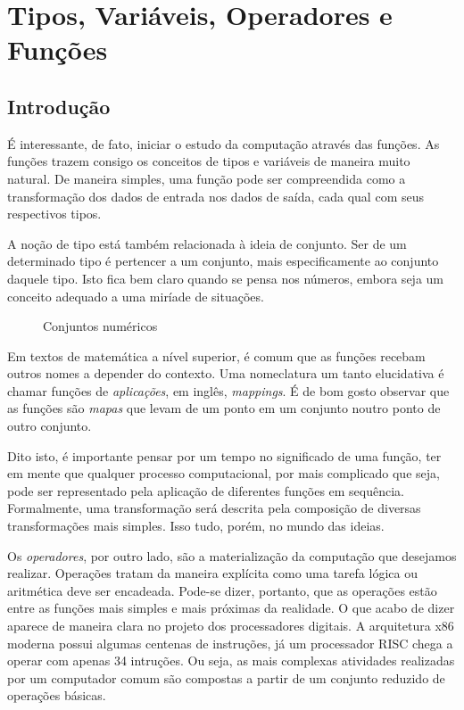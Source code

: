\chapter{Tipos, Variáveis, Operadores e Funções}%

	\section*{Introdução}%
	É interessante, de fato, iniciar o estudo da computação através das funções. As funções trazem consigo os conceitos de tipos e variáveis de maneira muito natural. De maneira simples, uma função pode ser compreendida como a transformação dos dados de entrada nos dados de saída, cada qual com seus respectivos tipos. \par
	
	A noção de tipo está também relacionada à ideia de conjunto. Ser de um determinado tipo é pertencer a um conjunto, mais especificamente ao conjunto daquele tipo. Isto fica bem claro quando se pensa nos números, embora seja um conceito adequado a uma miríade de situações. \par
	\begin{figure}[h]
		\label{f:conjuntos}
		\centering
		\medskip
		\caption{Conjuntos numéricos}
	\end{figure}
	Em textos de matemática a nível superior, é comum que as funções recebam outros nomes a depender do contexto. Uma nomeclatura um tanto elucidativa é chamar funções de \textit{aplicações}, em inglês, \textit{mappings}. É de bom gosto observar que as funções são \textit{mapas} que levam de um ponto em um conjunto noutro ponto de outro conjunto. \par

	Dito isto, é importante pensar por um tempo no significado de uma função, ter em mente que qualquer processo computacional, por mais complicado que seja, pode ser representado pela aplicação de diferentes funções em sequência. Formalmente, uma transformação será descrita pela composição de diversas transformações mais simples. Isso tudo, porém, no mundo das ideias. \par

	Os \textit{operadores}, por outro lado, são a materialização da computação que desejamos realizar. Operações tratam da maneira explícita como uma tarefa lógica ou aritmética deve ser encadeada. Pode-se dizer, portanto, que as operações estão entre as funções mais simples e mais próximas da realidade. O que acabo de dizer aparece de maneira clara no projeto dos processadores digitais. A arquitetura x86 moderna possui algumas centenas de instruções, já um processador RISC chega a operar com apenas 34 intruções\cite{arm:1995}. Ou seja, as mais complexas atividades realizadas por um computador comum são compostas a partir de um conjunto reduzido de operações básicas. \par

